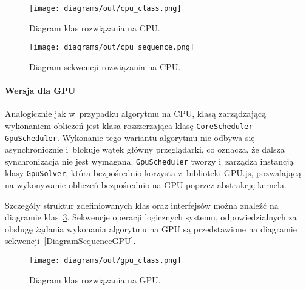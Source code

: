 \begin{figure}
    \centering
    \texttt{[image: diagrams/out/cpu\_class.png]}
    \caption{Diagram klas rozwiązania na CPU.}
    \label{DiagramClassCPU}
\end{figure}

\begin{figure}
    \centering
    \texttt{[image: diagrams/out/cpu\_sequence.png]}
    \caption{Diagram sekwencji rozwiązania na CPU.}
    \label{DiagramSequenceCPU}
\end{figure}


\paragraph{Wersja dla GPU}


Analogicznie jak w~przypadku algorytmu na CPU, klasą zarządzającą wykonaniem obliczeń jest klasa rozszerzająca klasę \texttt{CoreScheduler} -- \texttt{GpuScheduler}. Wykonanie tego wariantu algorytmu nie odbywa się asynchronicznie i~blokuje wątek główny przeglądarki, co oznacza, że dalsza synchronizacja nie jest wymagana. \texttt{GpuScheduler} tworzy i~zarządza instancją klasy \texttt{GpuSolver}, która bezpośrednio korzysta z~biblioteki GPU.js, pozwalającą na wykonywanie obliczeń bezpośrednio na GPU poprzez abstrakcję kernela.

Szczegóły struktur zdefiniowanych klas oraz interfejsów można znaleźć na diagramie klas~\ref{DiagramClassGPU}. Sekwencje operacji logicznych systemu, odpowiedzialnych za obsługę żądania wykonania algorytmu na GPU są przedstawione na diagramie sekwencji~\ref{DiagramSequenceGPU}.

\begin{figure}
    \centering
    \texttt{[image: diagrams/out/gpu\_class.png]}
    \caption{Diagram klas rozwiązania na GPU.}
    \label{DiagramClassGPU}
\end{figure}

